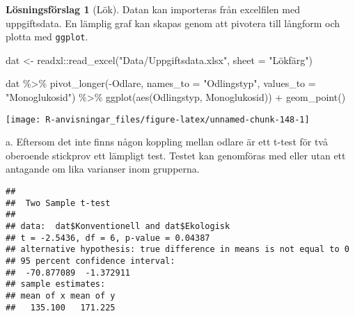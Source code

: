 \documentclass[
]{book}
\newenvironment{Shaded}{\begin{snugshade}}{\end{snugshade}}
\newcommand{\AttributeTok}[1]{\textcolor[rgb]{0.77,0.63,0.00}{#1}}
\newcommand{\FunctionTok}[1]{\textcolor[rgb]{0.00,0.00,0.00}{#1}}
\newcommand{\NormalTok}[1]{#1}
\newcommand{\OtherTok}[1]{\textcolor[rgb]{0.56,0.35,0.01}{#1}}
\newcommand{\SpecialCharTok}[1]{\textcolor[rgb]{0.00,0.00,0.00}{#1}}
\newcommand{\StringTok}[1]{\textcolor[rgb]{0.31,0.60,0.02}{#1}}
\theoremstyle{definition}
\theoremstyle{definition}
\theoremstyle{definition}
\theoremstyle{definition}
\newtheorem{hypothesis}{Lösningsförslag}[chapter]
\theoremstyle{remark}
\begin{document}
\begin{hypothesis}[Lök]
Datan kan importeras från excelfilen med uppgiftsdata. En lämplig graf kan skapas genom att pivotera till långform och plotta med \texttt{ggplot}.

\begin{Shaded}
\begin{Highlighting}[]
\NormalTok{dat }\OtherTok{\textless{}{-}}\NormalTok{ readxl}\SpecialCharTok{::}\FunctionTok{read\_excel}\NormalTok{(}\StringTok{"Data/Uppgiftsdata.xlsx"}\NormalTok{, }\AttributeTok{sheet =} \StringTok{"Lökfärg"}\NormalTok{)}

\NormalTok{dat }\SpecialCharTok{\%\textgreater{}\%} 
  \FunctionTok{pivot\_longer}\NormalTok{(}\SpecialCharTok{{-}}\NormalTok{Odlare, }\AttributeTok{names\_to =} \StringTok{"Odlingstyp"}\NormalTok{, }
               \AttributeTok{values\_to =} \StringTok{"Monoglukosid"}\NormalTok{) }\SpecialCharTok{\%\textgreater{}\%} 
  \FunctionTok{ggplot}\NormalTok{(}\FunctionTok{aes}\NormalTok{(Odlingstyp, Monoglukosid)) }\SpecialCharTok{+}
  \FunctionTok{geom\_point}\NormalTok{()}
\end{Highlighting}
\end{Shaded}

\begin{center}\texttt{[image: R-anvisningar\_files/figure-latex/unnamed-chunk-148-1]} \end{center}

a. Eftersom det inte finns någon koppling mellan odlare är ett t-test för två oberoende stickprov ett lämpligt test. Testet kan genomföras med eller utan ett antagande om lika varianser inom grupperna.

\begin{Shaded}
\end{Shaded}

\begin{verbatim}
## 
##  Two Sample t-test
## 
## data:  dat$Konventionell and dat$Ekologisk
## t = -2.5436, df = 6, p-value = 0.04387
## alternative hypothesis: true difference in means is not equal to 0
## 95 percent confidence interval:
##  -70.877089  -1.372911
## sample estimates:
## mean of x mean of y 
##   135.100   171.225
\end{verbatim}


\end{hypothesis}
\end{document}
